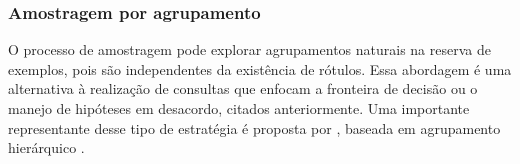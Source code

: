 % 

\subsubsection{Amostragem por agrupamento}\label{apresentahs}
O processo de amostragem pode explorar agrupamentos naturais na reserva de exemplos, pois são independentes da existência de rótulos.
Essa abordagem é uma alternativa à realização de consultas que enfocam a
fronteira de decisão ou o manejo de hipóteses em desacordo, citados anteriormente.
Uma importante representante desse tipo de estratégia é  proposta por , baseada em agrupamento hierárquico \cite{journals/cj/Murtagh83}.

